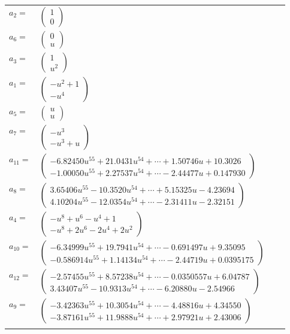 \documentclass[1p]{elsarticle_modified}
\theoremstyle{definition}
\begin{document}
\begin{tabular}{m{7pt} m{180pt} m{7pt} m{180pt} }
\flushright $a_{2}=$&$\begin{pmatrix}1\\0\end{pmatrix}$ \\
\flushright $a_{6}=$&$\begin{pmatrix}0\\u\end{pmatrix}$ \\
\flushright $a_{3}=$&$\begin{pmatrix}1\\u^2\end{pmatrix}$ \\
\flushright $a_{1}=$&$\begin{pmatrix}- u^2+1\\- u^4\end{pmatrix}$ \\
\flushright $a_{5}=$&$\begin{pmatrix}u\\u\end{pmatrix}$ \\
\flushright $a_{7}=$&$\begin{pmatrix}- u^3\\- u^3+u\end{pmatrix}$ \\
\flushright $a_{11}=$&$\begin{pmatrix}-6.82450 u^{55}+21.0431 u^{54}+\cdots+1.50746 u+10.3026\\-1.00050 u^{55}+2.27537 u^{54}+\cdots-2.44477 u+0.147930\end{pmatrix}$ \\
\flushright $a_{8}=$&$\begin{pmatrix}3.65406 u^{55}-10.3520 u^{54}+\cdots+5.15325 u-4.23694\\4.10204 u^{55}-12.0354 u^{54}+\cdots-2.31411 u-2.32151\end{pmatrix}$ \\
\flushright $a_{4}=$&$\begin{pmatrix}- u^8+u^6- u^4+1\\- u^8+2 u^6-2 u^4+2 u^2\end{pmatrix}$ \\
\flushright $a_{10}=$&$\begin{pmatrix}-6.34999 u^{55}+19.7941 u^{54}+\cdots-0.691497 u+9.35095\\-0.586914 u^{55}+1.14134 u^{54}+\cdots-2.44719 u+0.0395175\end{pmatrix}$ \\
\flushright $a_{12}=$&$\begin{pmatrix}-2.57455 u^{55}+8.57238 u^{54}+\cdots-0.0350557 u+6.04787\\3.43407 u^{55}-10.9313 u^{54}+\cdots-6.20880 u-2.54966\end{pmatrix}$ \\
\flushright $a_{9}=$&$\begin{pmatrix}-3.42363 u^{55}+10.3054 u^{54}+\cdots-4.48816 u+4.34550\\-3.87161 u^{55}+11.9888 u^{54}+\cdots+2.97921 u+2.43006\end{pmatrix}$\\&\end{tabular}
\end{document}
